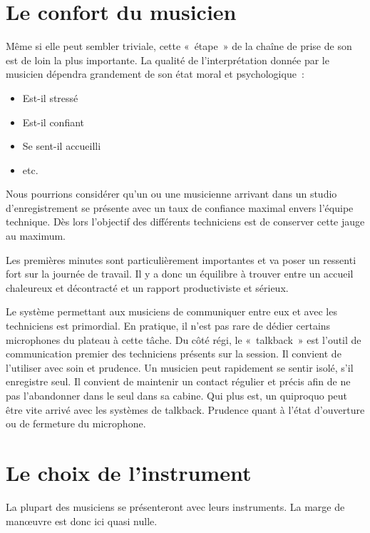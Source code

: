 \documentclass[
]{book}
\providecommand{\tightlist}{%
  \setlength{\itemsep}{0pt}\setlength{\parskip}{0pt}}
\begin{document}
\hypertarget{le-confort-du-musicien}{%
\section{Le confort du musicien}\label{le-confort-du-musicien}}

Même si elle peut sembler triviale, cette «~étape~» de la chaîne de prise de son est de loin la plus importante.
La qualité de l'interprétation donnée par le musicien dépendra grandement de son état moral et psychologique~:

\begin{itemize}
\tightlist
\item
  Est-il stressé
\item
  Est-il confiant
\item
  Se sent-il accueilli
\item
  etc.
\end{itemize}

Nous pourrions considérer qu'un ou une musicienne arrivant dans un studio d'enregistrement se présente avec un taux de confiance maximal envers l'équipe technique. Dès lors l'objectif des différents techniciens est de conserver cette jauge au maximum.

Les premières minutes sont particulièrement importantes et va poser un ressenti fort sur la journée de travail. Il y a donc un équilibre à trouver entre un accueil chaleureux et décontracté et un rapport productiviste et sérieux.

Le système permettant aux musiciens de communiquer entre eux et avec les techniciens est primordial. En pratique, il n'est pas rare de dédier certains microphones du plateau à cette tâche. Du côté régi, le «~talkback~» est l'outil de communication premier des techniciens présents sur la session. Il convient de l'utiliser avec soin et prudence. Un musicien peut rapidement se sentir isolé, s'il enregistre seul. Il convient de maintenir un contact régulier et précis afin de ne pas l'abandonner dans le seul dans sa cabine. Qui plus est, un quiproquo peut être vite arrivé avec les systèmes de talkback. Prudence quant à l'état d'ouverture ou de fermeture du microphone.

\hypertarget{le-choix-de-linstrument}{%
\section{Le choix de l'instrument}\label{le-choix-de-linstrument}}

La plupart des musiciens se présenteront avec leurs instruments. La marge de manœuvre est donc ici quasi nulle.
\end{document}
